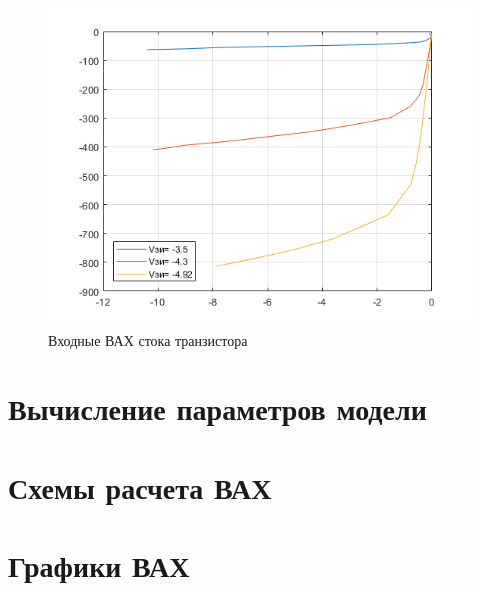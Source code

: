 \documentclass[a4paper,14pt]{article}
\begin{document}
\begin{figure}[H]
	\centering
	\includegraphics[width=0.7\linewidth]{image/graph_2}
	\caption{Входные ВАХ стока транзистора}
	\label{fig:graph2}
\end{figure}

\section{Вычисление параметров модели}
\section{Схемы расчета ВАХ}
\section{Графики ВАХ}
\end{document}
